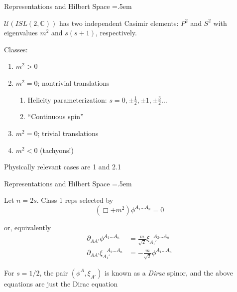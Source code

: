 \documentclass[xcolor={dvipsnames}]{beamer}
\let\olditemize=\itemize
\let\endolditemize=\enditemize
\renewenvironment{itemize}{\olditemize \itemsep=.5em }{\endolditemize}
\begin{document}
\begin{frame}{Representations and Hilbert Space}
    \begin{itemize}
        \item<2-> $\mathscr{U}(ISL(2, \mathbb{C}))$ has two independent Casimir elements: $P^2$ and $S^2$ with eigenvalues $m^2$ and $s(s+1)$, respectively.
        \item<3-> Classes:
        \begin{enumerate}
            \item<4-> $m^2 > 0$
            \item<5-> $m^2 = 0$; nontrivial translations
            \begin{enumerate}
                \item<6-> Helicity parameterization: $s = 0, \pm \frac{1}{2}, \pm 1, \pm\frac{3}{2}\dots$
                \item<7-> ``Continuous spin''
            \end{enumerate}
            \item<8-> $m^2 = 0$; trivial translations
            \item<9-> $m^2 < 0$ (tachyons!)
        \end{enumerate}
        \item<10-> Physically relevant cases are 1 and 2.1
    \end{itemize}    
\end{frame}

\begin{frame}{Representations and Hilbert Space}
    \begin{itemize}
        \item<1-> Let $n = 2s$. Class 1 reps selected by \[ \left(\Box + m^2\right)\phi^{A_1\dots A_n} = 0 \]
        \item<2-> or, equivalently
        \begin{align*}
            \partial_{AA'}\phi^{A_1\dots A_n} &= \frac{m}{\sqrt{2}}\xi_{A_1'}^{\;\;\;A_2\dots A_n} \\
            \partial_{AA'}\xi_{A_1'}^{\;\;\;A_2\dots A_n} &= -\frac{m}{\sqrt{2}}\phi^{A_1\dots A_n}
        \end{align*}
        \item<3-> For $s = 1/2$, the pair $(\phi^A, \xi_{A'})$ is known as a \textit{Dirac} spinor, and the above equations are just the Dirac equation
    \end{itemize}
\end{frame}
\end{document}
